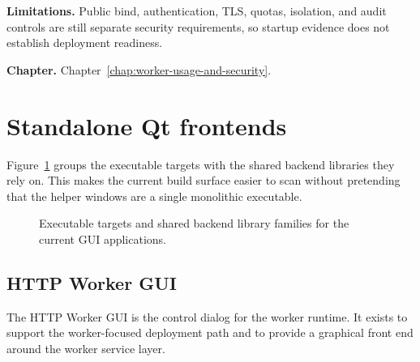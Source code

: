 \noindent\textbf{Limitations.} Public bind, authentication, TLS, quotas, isolation, and audit controls are still separate security requirements, so startup evidence does not establish deployment readiness.

\noindent\textbf{Chapter.} Chapter~\ref{chap:worker-usage-and-security}.

\section{Standalone Qt frontends}
\label{sec:application-overview-standalone-qt-frontends}

Figure~\ref{fig:application-executable-matrix} groups the executable targets
with the shared backend libraries they rely on. This makes the current build
surface easier to scan without pretending that the helper windows are a single
monolithic executable.

\begin{figure}[htbp]
\centering
{}
\caption{Executable targets and shared backend library families for the current GUI applications.}
\label{fig:application-executable-matrix}
\end{figure}

\subsection{HTTP Worker GUI}
\label{subsec:application-overview-http-worker-gui}

The HTTP Worker GUI is the control dialog for the worker runtime. It exists to
support the worker-focused deployment path and to provide a graphical front end
around the worker service layer.

